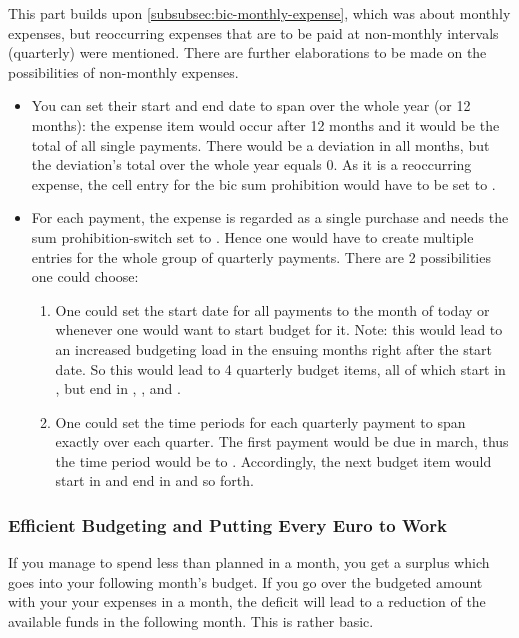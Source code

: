 This part builds upon \autoref{subsubsec:bic-monthly-expense}, which was about monthly expenses, but reoccurring expenses that are to be paid at non-monthly intervals (\eg quarterly) were mentioned.
There are further elaborations to be made on the possibilities of non-monthly expenses.
\begin{itemize}
	\item You can set their start and end date to span over the whole year (or 12 months): the expense item would occur after 12 months and it would be the total of all single payments.
	There would be a deviation in all months, but the deviation's total over the whole year equals 0.
	As it is a reoccurring expense, the cell entry for the \ac{bic} sum prohibition would have to be set to .
	\item For each payment, \ie the expense is regarded as a single purchase and needs the sum prohibition-switch set to .
	Hence one would have to create multiple entries for the whole group of quarterly payments.
	There are 2 possibilities one could choose:
	\begin{enumerate}
		\item One could set the start date for all payments to the month of today or whenever one would want to start budget for it.
		Note: this would lead to an increased budgeting load in the ensuing months right after the start date.
		So this would lead to 4 quarterly budget items, all of which start in , but end in , ,  and .
		\item One could set the time periods for each quarterly payment to span exactly over each quarter.
		The first payment would be due in march, thus the time period would be  to .
		Accordingly, the next budget item would start in  and end in  and so forth.
	\end{enumerate}
\end{itemize}

\subsubsection{Efficient Budgeting and Putting Every Euro to Work}
\label{subsubsec:efficient-budgeting}

If you manage to spend less than planned in a month, you get a surplus which goes into your following month's budget.
If you go over the budgeted amount with your your expenses in a month, the deficit will lead to a reduction of the available funds in the following month.
This is rather basic.

